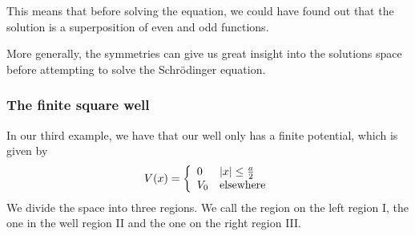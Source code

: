 This means that before solving the equation, we could have found out that the solution is a superposition of even and odd functions.

More generally, the symmetries can give us great insight into the solutions space before attempting to solve the Schrödinger equation.

\subsubsection{The finite square well}
In our third example, we have that our well only has a finite potential, which is given by
\begin{align*}
	V(x) = \left\{\begin{array}{ll}
		0 & \vert x\vert \leq \frac{a}{2} \\
		V_0 & \text{elsewhere}
	\end{array} \right.
\end{align*}
We divide the space into three regions. We call the region on the left region I, the one in the well region II and the one on the right region III.

